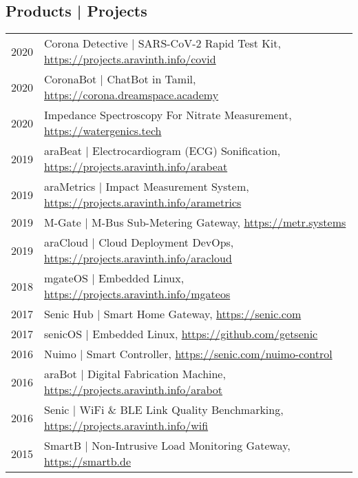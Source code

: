 \subsection{Products | Projects}
\begin{longtable}
	{r|p{13cm}}
	\textsc{2020} & Corona Detective | SARS-CoV-2 Rapid Test Kit, \href{https://projects.aravinth.info/covid}{https://projects.aravinth.info/covid}\\
	\textsc{2020} & CoronaBot | ChatBot in Tamil, \href{https://corona.dreamspace.academy}{https://corona.dreamspace.academy}\\
	\textsc{2020} & Impedance Spectroscopy For Nitrate Measurement, \href{https://watergenics.tech}{https://watergenics.tech}\\
	\textsc{2019} & araBeat | Electrocardiogram (ECG) Sonification, \href{https://projects.aravinth.info/arabeat}{https://projects.aravinth.info/arabeat}\\
	\textsc{2019} & araMetrics | Impact Measurement System, \href{https://projects.aravinth.info/arametrics}{https://projects.aravinth.info/arametrics}\\
	\textsc{2019} & M-Gate | M-Bus Sub-Metering Gateway, \href{https://metr.systems}{https://metr.systems}\\
	\textsc{2019} & araCloud | Cloud Deployment DevOps, \href{https://projects.aravinth.info/aracloud}{https://projects.aravinth.info/aracloud}\\
	\textsc{2018} & mgateOS | Embedded Linux, \href{https://projects.aravinth.info/mgateos}{https://projects.aravinth.info/mgateos}\\
	\textsc{2017} & Senic Hub | Smart Home Gateway, \href{https://senic.com}{https://senic.com}\\
	\textsc{2017} & senicOS | Embedded Linux, \href{https://github.com/getsenic}{https://github.com/getsenic}\\
	\textsc{2016} & Nuimo | Smart Controller, \href{https://senic.com/nuimo-control}{https://senic.com/nuimo-control}\\
	\textsc{2016} & araBot | Digital Fabrication Machine, \href{https://projects.aravinth.info/arabot}{https://projects.aravinth.info/arabot}\\
	\textsc{2016} & Senic | WiFi \& BLE Link Quality Benchmarking, \href{https://projects.aravinth.info/wifi}{https://projects.aravinth.info/wifi}\\
	\textsc{2015} & SmartB | Non-Intrusive Load Monitoring Gateway, \href{https://smartb.de}{https://smartb.de}\\

\end{longtable}
